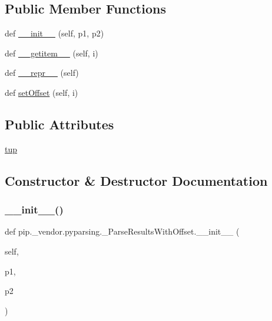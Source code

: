\subsection*{Public Member Functions}
\begin{DoxyCompactItemize}
\item 
def \hyperlink{classpip_1_1__vendor_1_1pyparsing_1_1__ParseResultsWithOffset_a46c35ff79573e550cc8bc89a771e37a4}{\+\_\+\+\_\+init\+\_\+\+\_\+} (self, p1, p2)
\item 
def \hyperlink{classpip_1_1__vendor_1_1pyparsing_1_1__ParseResultsWithOffset_a6afab4d711cbdccd27c0abf8446e7646}{\+\_\+\+\_\+getitem\+\_\+\+\_\+} (self, i)
\item 
def \hyperlink{classpip_1_1__vendor_1_1pyparsing_1_1__ParseResultsWithOffset_aee51f2011d510498231aad80ed42e595}{\+\_\+\+\_\+repr\+\_\+\+\_\+} (self)
\item 
def \hyperlink{classpip_1_1__vendor_1_1pyparsing_1_1__ParseResultsWithOffset_a2fe42fe2a2b6649c7a30bb22f521b61a}{set\+Offset} (self, i)
\end{DoxyCompactItemize}
\subsection*{Public Attributes}
\begin{DoxyCompactItemize}
\item 
\hyperlink{classpip_1_1__vendor_1_1pyparsing_1_1__ParseResultsWithOffset_afa3ae98e2f0e1c61ff3f8fa51bc077e8}{tup}
\end{DoxyCompactItemize}


\subsection{Constructor \& Destructor Documentation}
\mbox{\label{classpip_1_1__vendor_1_1pyparsing_1_1__ParseResultsWithOffset_a46c35ff79573e550cc8bc89a771e37a4}} 
\subsubsection{\texorpdfstring{\+\_\+\+\_\+init\+\_\+\+\_\+()}{\_\_init\_\_()}}
{\footnotesize\ttfamily def pip.\+\_\+vendor.\+pyparsing.\+\_\+\+Parse\+Results\+With\+Offset.\+\_\+\+\_\+init\+\_\+\+\_\+ (\begin{DoxyParamCaption}\item[{}]{self,  }\item[{}]{p1,  }\item[{}]{p2 }\end{DoxyParamCaption})}



